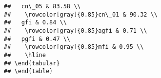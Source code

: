 \begin{knitrout}
\begin{kframe}
\begin{verbatim}
##   cn\_05 & 83.58 \\ 
##    \rowcolor[gray]{0.85}cn\_01 & 90.32 \\ 
##   gfi & 0.84 \\ 
##    \rowcolor[gray]{0.85}agfi & 0.71 \\ 
##   pgfi & 0.47 \\ 
##    \rowcolor[gray]{0.85}mfi & 0.95 \\ 
##    \hline
## \end{tabular}
## \end{table}
\end{verbatim}
\end{kframe}
\end{knitrout}